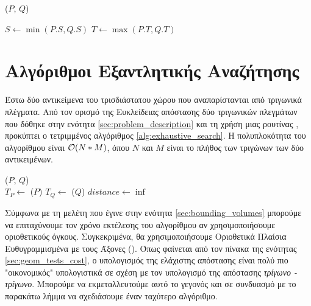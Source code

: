 \IncMargin{1.5em}
\begin{algorithm}[H]
    \label{alg:combine_aabbs}
    \caption[Κατασκευή  από δύο άλλα ]{
    }
    \DontPrintSemicolon
    \Indm\nonl\combineAABB($P$, $Q$)\\
    \Indp
        
    $S \gets \min(P.S, Q.S)$\;
    $T \gets \max(P.T, Q.T)$\; 
\end{algorithm}
\DecMargin{1.5em}

\section{Αλγόριθμοι Εξαντλητικής Αναζήτησης}
\label{sec:exhaustive_search}
Έστω δύο αντικείμενα του τρισδιάστατου χώρου που αναπαρίστανται από 
τριγωνικά πλέγματα.
Από τον ορισμό της Ευκλείδειας απόστασης δύο τριγωνικών πλεγμάτων που
δόθηκε στην ενότητα \ref{sec:problem_description} και τη χρήση μιας 
ρουτίνας , προκύπτει ο 
τετριμμένος αλγόριθμος \ref{alg:exhaustive_search}. 
Η πολυπλοκότητα του αλγορίθμου είναι $\mathcal{O}(N*M)$, όπου 
$N$ και $M$ είναι το πλήθος των τριγώνων των δύο αντικειμένων.

\IncMargin{1.5em}
\begin{algorithm}[h]
    \caption[Απόσταση Τριγωνικών Πλεγμάτων με Πλήρη Αναζήτηση]{
        }
    \label{alg:exhaustive_search}
    \DontPrintSemicolon
    \Indm\nonl\exhaustivesearch ($P$, $Q$)\\
    \Indp
        $T_P \gets$ \trias($P$) \;
        $T_Q \gets$ \trias($Q$) \; 
        $distance \gets \inf$ \;
\end{algorithm}
\DecMargin{1.5em}

Σύμφωνα με τη μελέτη που έγινε στην ενότητα \ref{sec:bounding_volumes}
μπορούμε να επιταχύνουμε τον χρόνο εκτέλεσης του αλγορίθμου αν 
χρησιμοποιήσουμε οριοθετικούς όγκους.
Συγκεκριμένα, θα χρησιμοποιήσουμε Οριοθετικά Πλαίσια Ευθυγραμμισμένα 
με τους Άξονες (). 
Όπως φαίνεται από τον πίνακα της ενότητας \ref{sec:geom_tests_cost},
ο υπολογισμός της ελάχιστης απόστασης \textit{} είναι πολύ πιο 
"οικονομικός" υπολογιστικά σε σχέση με τον υπολογισμό της απόστασης 
\textit{τρίγωνο - τρίγωνο}.
Μπορούμε να εκμεταλλευτούμε αυτό το γεγονός και σε συνδυασμό με το παρακάτω λήμμα 
να σχεδιάσουμε έναν ταχύτερο αλγόριθμο.

